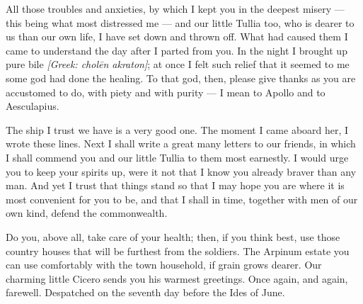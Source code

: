 

 All those troubles and anxieties, by which I kept you in the deepest misery --- this being what most distressed me --- and our little Tullia too, who is dearer to us than our own life, I have set down and thrown off. What had caused them I came to understand the day after I parted from you. In the night I brought up pure bile \textit{[Greek: chol\=en akraton]}; at once I felt such relief that it seemed to me some god had done the healing. To that god, then, please give thanks as you are accustomed to do, with piety and with purity --- I mean to Apollo and to Aesculapius.

 The ship I trust we have is a very good one. The moment I came aboard her, I wrote these lines. Next I shall write a great many letters to our friends, in which I shall commend you and our little Tullia to them most earnestly. I would urge you to keep your spirits up, were it not that I know you already braver than any man. And yet I trust that things stand so that I may hope you are where it is most convenient for you to be, and that I shall in time, together with men of our own kind, defend the commonwealth.

 Do you, above all, take care of your health; then, if you think best, use those country houses that will be furthest from the soldiers. The Arpinum estate you can use comfortably with the town household, if grain grows dearer. Our charming little Cicero sends you his warmest greetings. Once again, and again, farewell. Despatched on the seventh day before the Ides of June.

